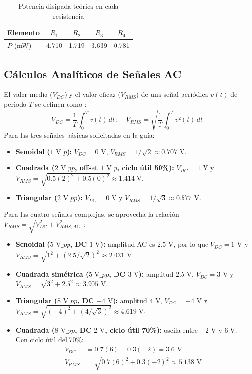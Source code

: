 \documentclass[journal, a4paper]{IEEEtran}
\begin{document}
\begin{table}[htbp]
\centering
\caption{Potencia disipada teórica en cada resistencia}
\label{tab:potencias}
\begin{tabular}{@{}lcccc@{}}
\toprule
\textbf{Elemento} & $R_1$ & $R_2$ & $R_3$ & $R_4$ \\ \midrule
$P$ (mW) & 4.710 & 1.719 & 3.639 & 0.781 \\ \bottomrule
\end{tabular}
\end{table}

\subsection{Cálculos Analíticos de Señales AC}
El valor medio ($V_{DC}$) y el valor eficaz ($V_{RMS}$) de una señal periódica $v(t)$ de periodo $T$ se definen como \cite{sedra2020}:
\begin{equation}
    V_{DC} = \frac{1}{T}\int_{0}^{T} v(t)\,dt \: ; \quad V_{RMS} = \sqrt{\frac{1}{T}\int_{0}^{T} v^2(t)\,dt}
\end{equation}
Para las tres señales básicas solicitadas en la guía:
\begin{itemize}
    \item \textbf{Senoidal ($1\text{ V}\_p$):} $V_{DC} = 0\text{ V}$, $V_{RMS} = 1/\sqrt{2} \approx 0.707\text{ V}$.
    \item \textbf{Cuadrada ($2\text{ V}\_{pp}$, offset $1\text{ V}\_p$, ciclo útil 50\%):} $V_{DC} = 1\text{ V}$ y $V_{RMS} = \sqrt{0.5(2)^2 + 0.5(0)^2} \approx 1.414\text{ V}$.
    \item \textbf{Triangular ($2\text{ V}\_{pp}$):} $V_{DC} = 0\text{ V}$ y $V_{RMS} = 1/\sqrt{3} \approx 0.577\text{ V}$.
\end{itemize}

Para las cuatro señales complejas, se aprovecha la relación $V_{RMS}=\sqrt{V_{DC}^2+V_{RMS,AC}^2}$ \cite{sedra2020}:
\begin{itemize}
    \item \textbf{Senoidal ($5\text{ V}\_{pp}$, DC $1\text{ V}$):} amplitud AC es $2.5\text{ V}$, por lo que $V_{DC}=1\text{ V}$ y $V_{RMS} = \sqrt{1^2 + (2.5/\sqrt{2})^2} \approx 2.031\text{ V}$.
    \item \textbf{Cuadrada simétrica ($5\text{ V}\_{pp}$, DC $3\text{ V}$):} amplitud $2.5\text{ V}$, $V_{DC}=3\text{ V}$ y $V_{RMS} = \sqrt{3^2 + 2.5^2} \approx 3.905\text{ V}$.
    \item \textbf{Triangular ($8\text{ V}\_{pp}$, DC $-4\text{ V}$):} amplitud $4\text{ V}$, $V_{DC}=-4\text{ V}$ y $V_{RMS} = \sqrt{(-4)^2 + (4/\sqrt{3})^2} \approx 4.619\text{ V}$.
    \item \textbf{Cuadrada ($8\text{ V}\_{pp}$, DC $2\text{ V}$, ciclo útil 70\%):} oscila entre $-2\text{ V}$ y $6\text{ V}$. Con ciclo útil del 70\%:
    \begin{align}
        V_{DC} &= 0.7(6) + 0.3(-2) = 3.6\text{ V} \\
        V_{RMS} &= \sqrt{0.7(6)^2 + 0.3(-2)^2} \approx 5.138\text{ V}
    \end{align}
\end{itemize}
\end{document}
